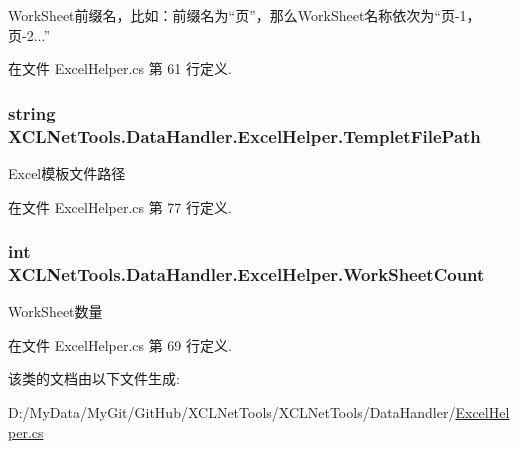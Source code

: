 Work\-Sheet前缀名，比如：前缀名为“页”，那么\-Work\-Sheet名称依次为“页-\/1，页-\/2...” 



在文件 Excel\-Helper.\-cs 第 61 行定义.

\hypertarget{class_x_c_l_net_tools_1_1_data_handler_1_1_excel_helper_a0e4501c60ef6446d0fe8151a6e58fca4}{
\subsubsection[{Templet\-File\-Path}]{\setlength{\rightskip}{0pt plus 5cm}string X\-C\-L\-Net\-Tools.\-Data\-Handler.\-Excel\-Helper.\-Templet\-File\-Path\hspace{0.3cm}{\ttfamily [set]}}}\label{class_x_c_l_net_tools_1_1_data_handler_1_1_excel_helper_a0e4501c60ef6446d0fe8151a6e58fca4}


Excel模板文件路径 



在文件 Excel\-Helper.\-cs 第 77 行定义.

\hypertarget{class_x_c_l_net_tools_1_1_data_handler_1_1_excel_helper_ab8d2677869ff64e25bbe54623ef9fa86}{
\subsubsection[{Work\-Sheet\-Count}]{\setlength{\rightskip}{0pt plus 5cm}int X\-C\-L\-Net\-Tools.\-Data\-Handler.\-Excel\-Helper.\-Work\-Sheet\-Count\hspace{0.3cm}{\ttfamily [get]}}}\label{class_x_c_l_net_tools_1_1_data_handler_1_1_excel_helper_ab8d2677869ff64e25bbe54623ef9fa86}


Work\-Sheet数量 



在文件 Excel\-Helper.\-cs 第 69 行定义.



该类的文档由以下文件生成\-:\begin{DoxyCompactItemize}
\item 
D\-:/\-My\-Data/\-My\-Git/\-Git\-Hub/\-X\-C\-L\-Net\-Tools/\-X\-C\-L\-Net\-Tools/\-Data\-Handler/\hyperlink{_excel_helper_8cs}{Excel\-Helper.\-cs}\end{DoxyCompactItemize}
